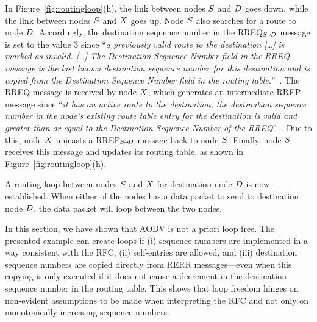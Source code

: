 \documentclass[letterpaper]{sig-alternate-pages}
\renewcommand{\msg}[3]{#1${}_{\!\!\;\MakeUppercase{#2}\!\!\:\shortrightarrow\!\MakeUppercase{#3}}$\xspace}
\newcommand{\gennode}[1]{\ensuremath{\MakeUppercase{#1}}\xspace}
\newcommand{\nd}{\gennode{d}}
\newcommand{\ns}{\gennode{s}}
\newcommand{\nx}{\gennode{x}}
\renewcommand{\sf}{\it}
\begin{document}
In Figure~\ref{fig:routingloop}(h), the link between nodes \ns and \nd goes down, while the link between nodes \ns and \nx goes up. Node \ns also searches for a route to node \nd. Accordingly, the destination sequence number in the \msg{RREQ}{s}{d} message is set to the value $3$ since ``{\sf a previously valid route to the destination {[\dots]} is marked as invalid. {[\dots]} The Destination Sequence Number field in the RREQ message is the last known destination sequence number for this destination and is copied from the Destination Sequence Number field in the routing table.\/}''~\cite[Sect. 6.3]{rfc3561}. The RREQ message is received by node \nx, which generates an intermediate RREP message since ``{\sf it has an active route to the destination, the destination sequence number in the node's existing route table entry for the destination is valid and greater than or equal to the Destination Sequence Number of the RREQ\/}''~\cite[Sect. 6.6]{rfc3561}. 
Due to this, node \nx unicasts a \msg{RREP}{s}{d} message back to node \ns. Finally, node \ns receives this message and updates its routing table, as shown in Figure~\ref{fig:routingloop}(h).

A routing loop between nodes \ns and \nx for destination node \nd is now established.
When either of the nodes has a data packet to send to destination node \nd, the data packet will loop between the two nodes.

In this section, we have shown that AODV is not a priori loop free. 
The presented example can create loops if
(i) sequence numbers are implemented in a way consistent with the RFC,
(ii) self-entries are allowed, and 
(iii) destination sequence numbers are copied directly from RERR messages---even when this copying is only executed if it does not cause a decrement in the destination sequence number in the routing table.
This shows that loop freedom hinges on non-evident assumptions to be made when interpreting the RFC 
and not only on monotonically increasing sequence numbers.
\end{document}
